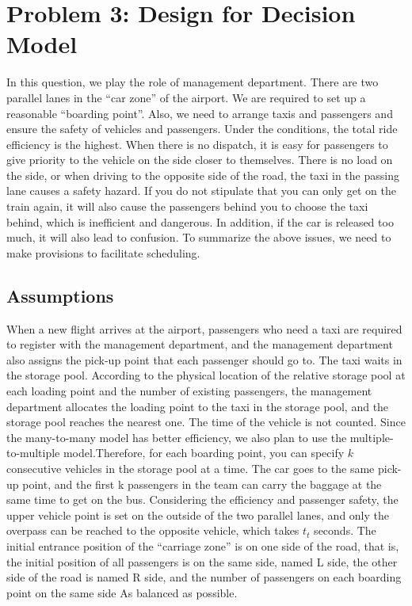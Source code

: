 \section{Problem 3: Design for Decision Model}
In this question, we play the role of management department. There are two parallel lanes in the “car zone” of the airport. We are required to set up a reasonable “boarding point”. Also, we need to arrange taxis and passengers and ensure the safety of vehicles and passengers. Under the conditions, the total ride efficiency is the highest. 
When there is no dispatch, it is easy for passengers to give priority to the vehicle on the side closer to themselves. There is no load on the side, or when driving to the opposite side of the road, the taxi in the passing lane causes a safety hazard. If you do not stipulate that you can only get on the train again, it will also cause the passengers behind you to choose the taxi behind, which is inefficient and dangerous. In addition, if the car is released too much, it will also lead to confusion. 
To summarize the above issues, we need to make provisions to facilitate scheduling.
\subsection{Assumptions}
\begin{sloppypar}
When a new flight arrives at the airport, passengers who need a taxi are required to register with the management department, and the management department also assigns the pick-up point that each passenger should go to. The taxi waits in the storage pool. According to the physical location of the relative storage pool at each loading point and the number of existing passengers, the management department allocates the loading point to the taxi in the storage pool, and the storage pool reaches the nearest one. The time of the vehicle is not counted. Since the many-to-many model has better efficiency, we also plan to use the multiple-to-multiple model.Therefore, for each boarding point, you can specify $k$ consecutive vehicles in the storage pool at a time. The car goes to the 
same pick-up point, and the first k passengers in the team can carry the 
baggage at the same time to get on the bus. Considering the efficiency and passenger safety, the upper vehicle point is set on the outside of the two parallel 
lanes, and only the overpass can be reached to the opposite vehicle, which
takes $t_{t}$ seconds.
The initial entrance position of the “carriage zone” is on one side of the
road, that is, the initial position of all passengers is on the same side,
named L side, the other side of the road is named R side, and the number 
of passengers on each boarding point on the same side As balanced as 
possible.
\end{sloppypar}
